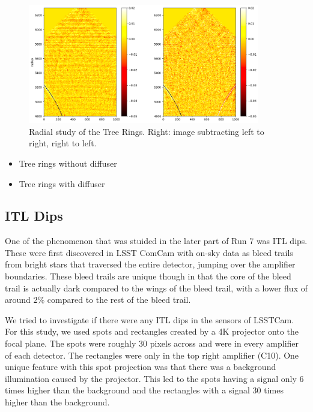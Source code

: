 \begin{figure}
\begin{centering}
\includegraphics[width=0.9\textwidth]{sections/figures/TR_radial.png}
\end{centering}
\caption{Radial study of the Tree Rings. Right: image subtracting left to right, right to left.}
\end{figure}

\begin{itemize}
\tightlist
\item
  Tree rings without diffuser
\item
  Tree rings with diffuser
\end{itemize}

\subsection{ITL Dips}\label{itl-dips}

One of the phenomenon that was stuided in the later part of Run 7 was
ITL dips. These were first discovered in LSST ComCam with on-sky data as
bleed trails from bright stars that traversed the entire detector,
jumping over the amplifier boundaries. These bleed trails are unique
though in that the core of the bleed trail is actually
\textquotesingle dark\textquotesingle{} compared to the wings of the
bleed trail, with a lower flux of around 2\% compared to the rest of the
bleed trail.

We tried to investigate if there were any ITL dips in the sensors of
LSSTCam. For this study, we used spots and rectangles created by a 4K
projector onto the focal plane. The spots were roughly 30 pixels across
and were in every amplifier of each detector. The rectangles were only
in the top right amplifier (C10). One unique feature with this spot
projection was that there was a background illumination caused by the
projector. This led to the spots having a signal only 6 times higher
than the background and the rectangles with a signal 30 times higher
than the background.

